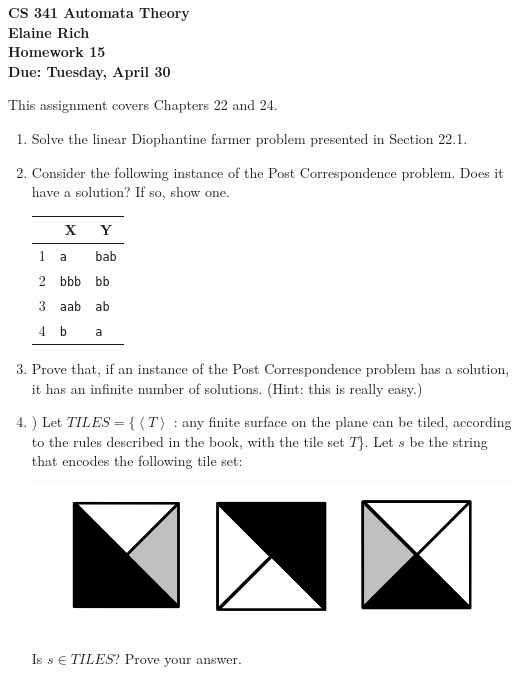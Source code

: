 \documentclass[10pt]{article}
\newcommand{\brackets}[1]{\left< #1 \right>}
\begin{document}
\begin{center}
\textbf{
CS 341 Automata Theory \\
Elaine Rich \\
Homework 15 \\
Due: Tuesday, April 30}\\
\end{center}

\noindent
This assignment covers Chapters 22 and 24.\\

\begin{enumerate}[1)]


\item
Solve the linear Diophantine farmer problem presented in Section 22.1.


\item
Consider the following instance of the Post Correspondence problem.  Does it have a solution?  If so, show one.\\
\begin{center}
\begin{tabular}{| p{1cm} | p{3cm} | p{3cm} |}
  \hline
  \multicolumn{1}{|c}{}&
  \multicolumn{1}{|c|}{X}&
  \multicolumn{1}{c|}{Y}\\
  \hline
  1&\texttt{a}&\texttt{bab}\\
  \hline
  2&\texttt{bbb}&\texttt{bb}\\
  \hline
  3&\texttt{aab}&\texttt{ab}\\
  \hline
  4&\texttt{b}&\texttt{a}\\
  \hline
\end{tabular}
\end{center}

\item
Prove that, if an instance of the Post Correspondence problem has a solution, it has an infinite number of solutions. (Hint: this is really easy.)


\item
) Let $TILES = \{\brackets{T}$ : any finite surface on the plane can be tiled, according to the rules described in the book, with the tile set $T$\}.  Let $s$ be the string that encodes the following tile set:\\

\begin{center}
\includegraphics[scale=.2]{images/tiles.png}
\end{center}
Is $s \in TILES$?  Prove your answer.


\end{enumerate}
\end{document}

